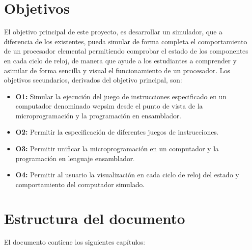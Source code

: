 \section{Objetivos}
\label{sec:objectives}

El objetivo principal de este proyecto, es desarrollar un simulador, que a diferencia de los existentes, pueda simular de forma completa el comportamiento de un procesador elemental permitiendo comprobar el estado de los componentes en cada ciclo de reloj, de manera que ayude a los estudiantes a comprender y asimilar de forma sencilla y visual el funcionamiento de un procesador. Los objetivos secundarios, derivados del objetivo principal, son:

\begin{itemize}

\item \textbf{O1:} Simular la ejecución del juego de instrucciones especificado en un computador denominado \acrshort{wepsim} desde el punto de vista de la microprogramación y la programación en \gls{ensamblador}.

\item \textbf{O2:} Permitir la especificación de diferentes juegos de instrucciones.

\item \textbf{O3:} Permitir unificar la microprogramación en un computador y la programación en lenguaje \gls{ensamblador}.

\item \textbf{O4:} Permitir al usuario la visualización en cada ciclo de reloj del estado y comportamiento del computador simulado.

\end{itemize}

\section{Estructura del documento}
\label{sec:document_structure}

El documento contiene los siguientes capítulos:

